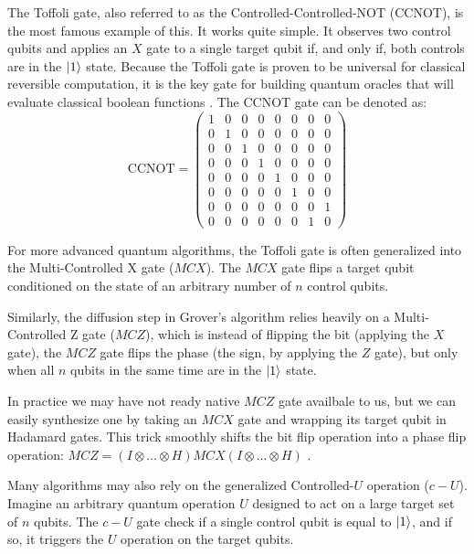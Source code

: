 %
%
The Toffoli gate, also referred to as the Controlled-Controlled-NOT (CCNOT), is the most famous example of this.
It works quite simple. It observes two control qubits and applies an $X$ gate to a single target qubit if, and only if, 
both controls are in the $\ket{1}$ state.
%
%
Because the Toffoli gate is proven to be universal for classical reversible computation, 
it is the key gate for building quantum oracles that will evaluate classical boolean functions \cite{nielsen2010quantum}. 
The CCNOT gate can be denoted as:
%
%
\bigskip
\begin{equation}
    \text{CCNOT} = \begin{pmatrix} 
    1 & 0 & 0 & 0 & 0 & 0 & 0 & 0 \\
    0 & 1 & 0 & 0 & 0 & 0 & 0 & 0 \\
    0 & 0 & 1 & 0 & 0 & 0 & 0 & 0 \\
    0 & 0 & 0 & 1 & 0 & 0 & 0 & 0 \\
    0 & 0 & 0 & 0 & 1 & 0 & 0 & 0 \\
    0 & 0 & 0 & 0 & 0 & 1 & 0 & 0 \\
    0 & 0 & 0 & 0 & 0 & 0 & 0 & 1 \\
    0 & 0 & 0 & 0 & 0 & 0 & 1 & 0 
    \end{pmatrix}
\end{equation}
\bigskip

%
%
For more advanced quantum algorithms, the Toffoli gate is often generalized into the Multi-Controlled X gate ($MCX$).
The $MCX$ gate flips a target qubit conditioned on the state of an arbitrary number of $n$ control qubits.

%
%
Similarly, the diffusion step in Grover's algorithm relies heavily on a Multi-Controlled Z gate ($MCZ$), which is 
instead of flipping the bit (applying the $X$ gate), the $MCZ$ gate flips the phase (the sign, by applying the $Z$ gate), 
but only when all $n$ qubits in the same time are in the $\ket{1}$ state.

%
%
In practice we may have not ready native $MCZ$ gate availbale to us, but we can easily synthesize one by taking an $MCX$ 
gate and wrapping its target qubit in Hadamard gates.
This trick smoothly shifts the bit flip operation into a phase flip operation: 
$MCZ = (I \otimes \dots \otimes H) MCX (I \otimes \dots \otimes H)$ \cite{barenco1995elementary}.

%
%
Many algorithms may also rely on the generalized Controlled-$U$ operation ($c-U$).
Imagine an arbitrary quantum operation $U$ designed to act on a large target set of $n$ qubits.
The $c-U$ gate check if a single control qubit is equal to $\ket{1}$, and if so, 
it triggers the $U$ operation on the target qubits.